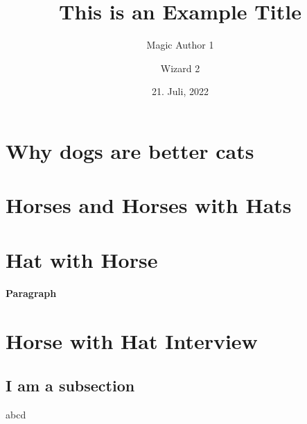 \documentclass[a3paper, protrait, ngerman]{uulm-cs-poster}
\title{This is an Example Title}
\author{Magic Author 1\and Wizard 2}
\date{21. Juli, 2022}
\begin{document}
\maketitle
\section*{Why dogs are better cats}
\lipsum[2]
\begin{multicols}{3}
\section*{Horses and Horses with Hats}
   \lipsum[1-4]
\section*{Hat with Horse}
   \lipsum[4-6]
   \paragraph{Paragraph}\lipsum[7]
\end{multicols}
\lipsum[2]
\section*{Horse with Hat Interview}
\begin{multicols}{4}
   \lipsum[2]
   \subsection*{I am a subsection}
   abcd
\end{multicols}
\end{document}
